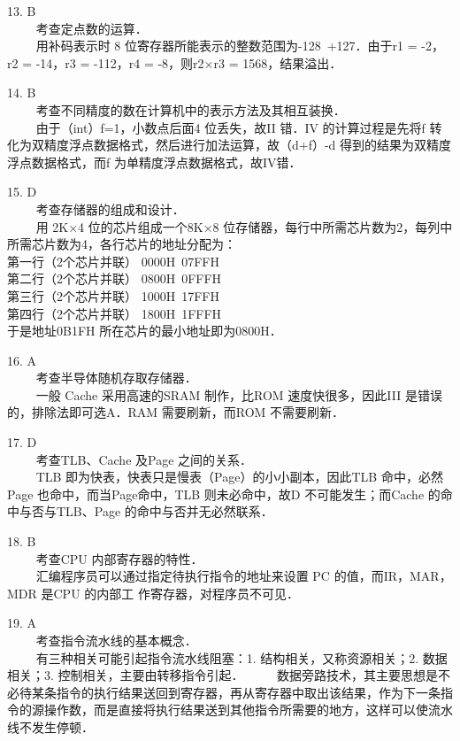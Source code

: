 13. B \\
$\qquad$ 考查定点数的运算．\\
$\qquad$ 用补码表示时 8 位寄存器所能表示的整数范围为-128~+127．由于r1 = -2，r2 = -14，r3 = -112，r4 = -8，则r2×r3 = 1568，结果溢出．

14. B \\
$\qquad$ 考查不同精度的数在计算机中的表示方法及其相互装换．\\
$\qquad$ 由于（int）f=1，小数点后面4 位丢失，故II 错．IV 的计算过程是先将f 转化为双精度浮点数据格式，然后进行加法运算，故（d+f）-d 得到的结果为双精度浮点数据格式，而f 为单精度浮点数据格式，故IV错．

15. D \\
$\qquad$ 考查存储器的组成和设计．\\
$\qquad$ 用 2K×4 位的芯片组成一个8K×8 位存储器，每行中所需芯片数为2，每列中所需芯片数为4，各行芯片的地址分配为：\\
第一行（2个芯片并联） 0000H~07FFH \\
第二行（2个芯片并联） 0800H~0FFFH \\
第三行（2个芯片并联） 1000H~17FFH \\
第四行（2个芯片并联） 1800H~1FFFH \\
于是地址0B1FH 所在芯片的最小地址即为0800H．

16. A \\
$\qquad$ 考查半导体随机存取存储器．\\
$\qquad$ 一般 Cache 采用高速的SRAM 制作，比ROM 速度快很多，因此III 是错误的，排除法即可选A．RAM 需要刷新，而ROM 不需要刷新．

17. D \\
$\qquad$ 考查TLB、Cache 及Page 之间的关系．\\
$\qquad$ TLB 即为快表，快表只是慢表（Page）的小小副本，因此TLB 命中，必然Page 也命中，而当Page命中，TLB 则未必命中，故D 不可能发生；而Cache 的命中与否与TLB、Page 的命中与否并无必然联系．

18. B \\
$\qquad$ 考查CPU 内部寄存器的特性．\\
$\qquad$ 汇编程序员可以通过指定待执行指令的地址来设置 PC 的值，而IR，MAR，MDR 是CPU 的内部工
作寄存器，对程序员不可见．

19. A \\
$\qquad$ 考查指令流水线的基本概念．\\
$\qquad$ 有三种相关可能引起指令流水线阻塞：1. 结构相关，又称资源相关；2. 数据相关；3. 控制相关，主要由转移指令引起．
$\qquad$ 数据旁路技术，其主要思想是不必待某条指令的执行结果送回到寄存器，再从寄存器中取出该结果，作为下一条指令的源操作数，而是直接将执行结果送到其他指令所需要的地方，这样可以使流水线不发生停顿．

